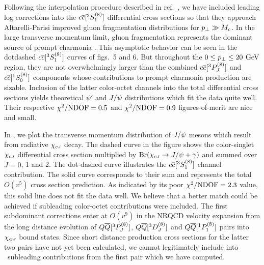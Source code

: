 	Following the interpolation procedure described in ref.~\ChoLeibov, 
we have included leading log corrections into the $c{\overline c}[ ^3S_1^{(8)}]$ 
differential cross sections so that they approach Altarelli-Parisi improved 
gluon fragmentation distributions for $p_\perp \gg M_c$.  In the large transverse 
momentum limit, gluon fragmentation represents the dominant source of 
prompt charmonia .  This asymptotic 
behavior can be seen in the dotdashed $c{\overline c}[ ^3S_1^{(8)}]$ curves of figs.~5 and 
6.  But throughout the $0 \le p_\perp \le 20 {\>\, \rm GeV}$ region, they are not 
overwhelmingly larger than the combined $c{\overline c}[ ^3P_J^{(8)}]$ and 
$c{\overline c}[ ^1S_0^{(8)}]$ components whose contributions to prompt charmonia 
production are sizable.  Inclusion of the latter color-octet channels into the 
total differential cross sections yields theoretical $\psi'$ and $J/\psi$ 
distributions which fit the data quite well.  Their respective 
$\chi^2/{\rm NDOF} = 0.5$ and $\chi^2/{\rm NDOF} = 0.9$ figures-of-merit are nice and 
small.

	In \ChicJxsect, we plot the transverse momentum distribution of 
$J/\psi$ mesons which result from radiative $\chi_{c{\scriptscriptstyle J}}$ decay.  The dashed curve 
in the figure shows the color-singlet $\chi_{c{\scriptscriptstyle J}}$ differential cross section 
multiplied by ${\rm Br}(\chi_{c{\scriptscriptstyle J}} \to J/\psi + \gamma)$ and summed over $J=0$, 1 and 
2.  The dot-dashed curve illustrates the $c{\overline c}[ ^3S_1^{(8)}]$ channel 
contribution.  The solid curve corresponds to their sum and represents the 
total $O(v^5)$ cross section prediction.  As indicated by its 
poor $\chi^2/{\rm NDOF} = 2.3$ value, this solid line does not fit the data 
well.  We believe that a better match could be achieved if subleading 
color-octet contributions were included.  The first subdominant corrections 
enter at $O(v^9)$ in the NRQCD velocity expansion from the long distance 
evolution of $Q{\overline Q}[ ^3P_J^{(8)}]$, $Q{\overline Q}[^3D_J^{(8)}]$ and 
$Q{\overline Q}[^1P_1^{(8)}]$ pairs into $\chi_{{\scriptscriptstyle Q}{\scriptscriptstyle J}}$ bound states.  Since short 
distance production cross sections for the latter two pairs have not yet been 
calculated, we cannot legitimately include into \ChicJxsect\ subleading 
contributions from the first pair which we have computed. 

